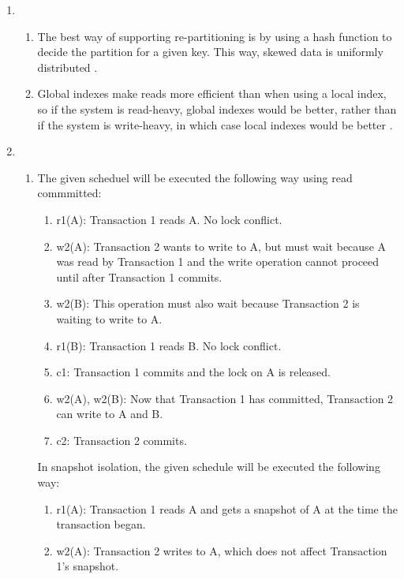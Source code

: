 \begin{enumerate}
\begin{enumerate}
                \autocite[p.~159]{kleppmann_2017}.
        \end{enumerate}
    \item 
    \begin{enumerate}
        \item The best way of supporting re-partitioning is by using a hash
            function to decide the partition for a given key. This way,
            skewed data is uniformly distributed 
            \autocite[pp.~201-205]{kleppmann_2017}.
        \item Global indexes make reads more efficient than when using a local
            index, so if the system is read-heavy, global indexes would be
            better, rather than if the system is write-heavy, in which case
            local indexes would be better \autocite[p.~208]{kleppmann_2017}.
    \end{enumerate}
    \item 
    \begin{enumerate}
        \item The given scheduel will be executed the following way using 
            read commmitted:
            \begin{enumerate}
                \item r1(A): Transaction 1 reads A. No lock conflict.
                \item w2(A): Transaction 2 wants to write to A, but must wait because A was read by Transaction 1 and the write operation cannot proceed until after Transaction 1 commits.
                \item w2(B): This operation must also wait because Transaction 2 is waiting to write to A.
                \item r1(B): Transaction 1 reads B. No lock conflict.
                \item c1: Transaction 1 commits and the lock on A is released.
                \item w2(A), w2(B): Now that Transaction 1 has committed, Transaction 2 can write to A and B.
                \item c2: Transaction 2 commits.
            \end{enumerate}
            In snapshot isolation, the given schedule will be executed the
            following way:
            \begin{enumerate}
                \item r1(A): Transaction 1 reads A and gets a snapshot of A at the time the transaction began.
                \item w2(A): Transaction 2 writes to A, which does not affect Transaction 1's snapshot.

\end{enumerate}
\end{enumerate}
\end{enumerate}
